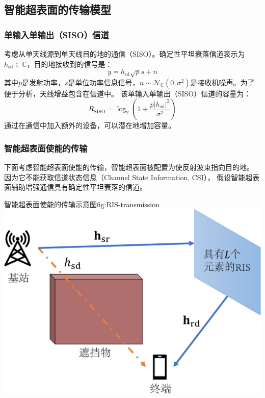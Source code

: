 \documentclass[supercite]{HustGraduPaper}
\begin{document}
\subsection{智能超表面的传输模型}\label{subsec:transmission}

\subsubsection{单输入单输出（SISO）信道}

考虑从单天线源到单天线目的地的通信（SISO）。确定性平坦衰落信道表示为$h_{\mathrm{sd}} \in \mathbb{C}$，目的地接收到的信号是：
\begin{equation}
	y=h_{\mathrm{sd}} \sqrt{p} s + n
\end{equation}
其中$p$是发射功率，$s$是单位功率信息信号，$n \sim \mathcal{N}_{\mathbb{C}}\left(0, \sigma^{2}\right)$是接收机噪声。为了便于分析，天线增益包含在信道中。
该单输入单输出（SISO）信道的容量为：
\begin{equation}
	R_{\mathrm{SISO}}=\log _{2}\left(1+\frac{p\left|h_{\mathrm{sd}}\right|^{2}}{\sigma^{2}}\right)
\end{equation}
通过在通信中加入额外的设备，可以潜在地增加容量。

\subsubsection{智能超表面使能的传输}

下面考虑智能超表面使能的传输，智能超表面被配置为使反射波束指向目的地。
因为它不能获取信道状态信息（Channel State Information, CSI），
假设智能超表面辅助增强通信具有确定性平坦衰落的信道。

\begin{generalfig}[htb]{智能超表面使能的传输示意图}{fig:RIS-transmission}
	\includegraphics[width=0.6\linewidth]{Figures/RIS-transmission.pdf}
\end{generalfig}
\end{document}
